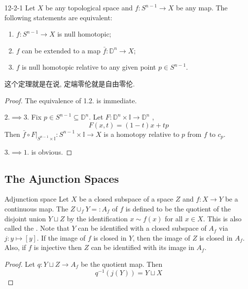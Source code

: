 \documentclass[../main.tex]{subfiles}
\begin{document}
\begin{theorem}{}{12-2-1}
Let $X$ be any topological space and $f\colon S^{n-1} \to X$ be any map. The following statements are equivalent:
\begin{enumerate}
\item $f\colon S^{n-1} \to X$ is null homotopic;
\item $f$ can be extended to a map $\bar f\colon \mathbb{D}^n \to X$;
\item $f$ is null homotopic relative to any given point $p \in S^{n-1}$.
\end{enumerate}
\end{theorem}
\begin{remark}
    这个定理就是在说, 定端零伦就是自由零伦.
\end{remark}
\begin{proof}
    The equivalence of 1.2. is immediate.

    \(  2.\implies 3.  \) Fix \(  p \in S^{n-1}  \subseteq \mathbb{D}^{n}\). Let \(  F: \mathbb{D}^{n}\times  \mathbb{I}\to \mathbb{D}^{n}  \) , \[
    F\left( x,t \right)= \left( 1-t \right)x+ tp  
    \] Then \(  \bar{f}\circ F|_{{S}^{n-1}\times \mathbb{I}} :S^{n-1}\times \mathbb{I}\to X  \)  is a homotopy relative to \(  p  \) from \(  f  \) to \(  c_{p}  \).
    
    \(  3.\implies  1. \) is obvious. 
\end{proof}


\subsection{The Ajunction Spaces}

\begin{definition}{Adjunction space}{}
Let $X$ be a closed subspace of a space $Z$ and $f:X\to Y$ be a continuous map. The  $Z\cup_{f}Y=:A_{f}$ of $f$ is defined to be the quotient of the disjoint union $Y\sqcup Z$ by the identification $x\sim f(x)$ for all $x\in X$. This is also called the . Note that $Y$ can be identified with a closed subspace of $A_{f}$ via $j:y\mapsto [y]$. If the image of $f$ is closed in $Y$, then the image of $Z$ is closed in $A_{f}$. Also, if $f$ is injective then $Z$ can be identified with its image in $A_{f}$.
\end{definition}

\begin{proof}
  Let \(  q: Y\sqcup Z\to A_{f}  \) be the quotient map. Then \[
  q^{-1} \left( j\left( Y \right)  \right)=Y \sqcup X  
  \] 
\end{proof}
\end{document}
